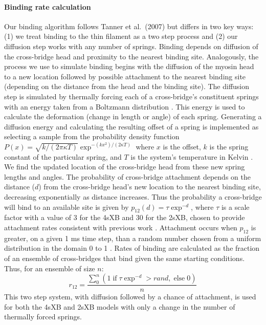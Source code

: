 \documentclass[10pt]{article}
\newcommand{\citep}[1]{\cite{#1}} %
\begin{document}
\paragraph{Binding rate calculation} %
Our binding algorithm follows Tanner et al.~(2007) \citep{Tanner2007} but differs in two key ways: (1) we treat binding to the thin filament as a two step process and (2) our diffusion step works with any number of springs.
Binding depends on diffusion of the cross-bridge head and proximity to the nearest binding site.
Analogously, the process we use to simulate binding begins with the diffusion of the myosin head to a new location followed by possible attachment to the nearest binding site (depending on the distance from the head and the binding site).
The diffusion step is simulated by thermally forcing each of a cross-bridge's constituent springs with an energy taken from a Boltzmann distribution \citep{BergBook, HowardBook}.
This energy is used to calculate the deformation (change in length or angle) of each spring. 
Generating a diffusion energy and calculating the resulting offset of a spring is implemented as selecting a sample from the probability density function $P(x) = \sqrt{k / (2 \pi \kappa T)} \exp^{-(k x^2)/(2 \kappa T)}$ where $x$ is the offset, $k$ is the spring constant of the particular spring, and $T$ is the system's temperature in Kelvin  \citep{DillBook, HowardBook}. %
We find the updated location of the cross-bridge head from these new spring lengths and angles.
The probability of cross-bridge attachment depends on the distance ($d$) from the cross-bridge head's new location to the nearest binding site, decreasing exponentially as distance increases. %
Thus the probability a cross-bridge will bind to an available site is given by $p_{12}(d) = \tau \exp ^{-d}$, where $\tau$ is a scale factor with a value of 3 for the 4sXB and 30 for the 2sXB, chosen to provide attachment rates consistent with previous work \citep{Daniel1998, Tanner2007}.
Attachment occurs when $p_{12}$ is greater, on a given 1 ms time step, than a random number chosen from a uniform distribution in the domain 0 to 1 \citep{Tanner2007}.
Rates of binding are calculated as the fraction of an ensemble of cross-bridges that bind given the same starting conditions. 
Thus, for an ensemble of size $n$:
\begin{equation}
    r_{12} =  \frac{\sum_0^n \left( 1\; \textrm{if}\; \tau \exp^{-d}>rand ,\; \textrm{else}\; 0 \right)}{n}  
    \label{eq_r12}
\end{equation}
This two step system, with diffusion followed by a chance of attachment, is used for both the 4sXB and 2sXB models with only a change in the number of thermally forced springs.
\end{document}

